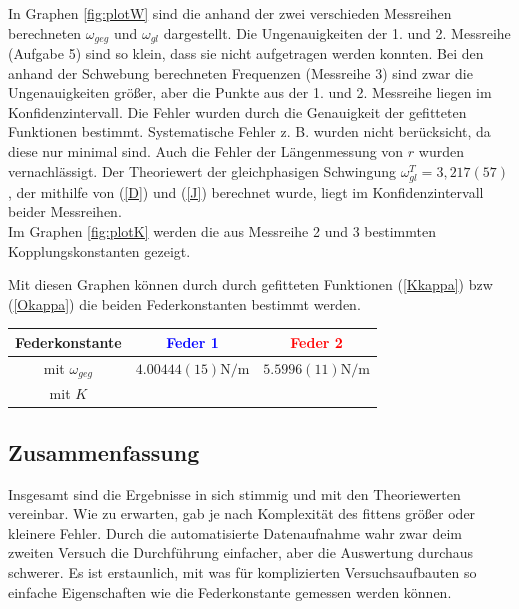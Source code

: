 \documentclass[11pt, a4paper]{article}
\begin{document}
    In Graphen \ref{fig:plotW} sind die anhand der zwei verschieden Messreihen
    berechneten $\omega_{geg}$ und $\omega_{gl}$ dargestellt. Die Ungenauigkeiten der 1. und 2. Messreihe (Aufgabe 5) sind so klein,
    dass sie nicht aufgetragen werden konnten. Bei den anhand der Schwebung berechneten Frequenzen (Messreihe 3)
    sind zwar die Ungenauigkeiten größer, aber die Punkte aus der 1. und 2. Messreihe liegen im Konfidenzintervall.
    Die Fehler wurden durch die Genauigkeit der gefitteten Funktionen bestimmt. Systematische Fehler z. B. wurden
    nicht berücksicht, da diese nur minimal sind. Auch die Fehler der Längenmessung von $r$ wurden vernachlässigt.
    Der Theoriewert der gleichphasigen Schwingung $\omega_{gl}^T = 3,217(57)$,
    der mithilfe von (\ref{D}) und (\ref{J}) berechnet wurde,
    liegt im Konfidenzintervall beider Messreihen. \\
    
    Im Graphen \ref{fig:plotK} werden die aus Messreihe 2 und 3 bestimmten Kopplungskonstanten gezeigt.

    Mit diesen Graphen können durch durch gefitteten Funktionen (\ref{Kkappa}) bzw (\ref{Okappa}) die beiden
    Federkonstanten bestimmt werden.
    \begin{table}[H]
        \centering
        \begin{tabular}{c c c}
            Federkonstante & \textcolor{blue}{Feder 1} & \textcolor{red}{Feder 2} \\ \hline
            mit $\omega_{geg}$ & $4.00444(15) \si{\newton\per\metre}$ & $5.5996(11)\si{\newton\per\metre}$\\
            mit $K$ & 
            
        \end{tabular}
    \end{table}


    \subsection{Zusammenfassung}
    Insgesamt sind die Ergebnisse in sich stimmig und mit den Theoriewerten vereinbar. Wie zu erwarten, gab
    je nach Komplexität des fittens größer oder kleinere Fehler. Durch die automatisierte Datenaufnahme
    wahr zwar deim zweiten Versuch die Durchführung einfacher, aber die Auswertung durchaus schwerer.
    Es ist erstaunlich, mit was für komplizierten
    Versuchsaufbauten so einfache Eigenschaften wie die Federkonstante gemessen werden können.
\end{document}
